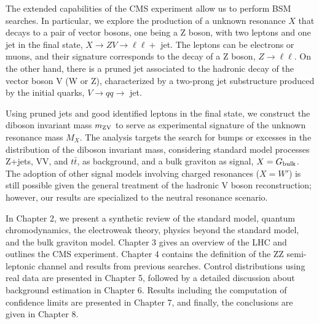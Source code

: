 The extended capabilities of the CMS experiment allow us to perform BSM searches. In particular, we explore the production of a unknown resonance $X$ that decays to a pair of vector bosons, one being a Z boson, with two leptons and one jet in the final state, $X \rightarrow ZV \rightarrow \ell \ell + $ jet. The leptons can be electrons or muons, and their signature corresponds to the decay of a Z boson, $Z\rightarrow \ell \ell$. On the other hand, there is a pruned jet associated to the hadronic decay of the vector boson V (W or Z), characterized by a two-prong jet substructure produced by the initial quarks, $V \rightarrow qq \rightarrow$ jet.

Using pruned jets and good identified leptons in the final state, we construct the diboson invariant mass $m_\mathrm{ZV}$ to serve as experimental signature of the unknown resonance mass $M_X$. The analysis targets the search for bumps or excesses in the distribution of the diboson invariant mass, considering standard model processes Z+jets, VV, and $t\bar{t}$, as background, and a bulk graviton as signal, $X = G_{\rm bulk}$. The adoption of other signal models involving charged resonances ($X=W'$) is still possible given the general treatment of the hadronic V boson reconstruction; however, our results are specialized to the neutral resonance scenario.

In Chapter 2, we present a synthetic review of the standard model, quantum chromodynamics, the electroweak theory, physics beyond the standard model, and the bulk graviton model. Chapter 3 gives an overview of the LHC and outlines the CMS experiment. Chapter 4 contains the definition of the ZZ semi-leptonic channel and results from previous searches. Control distributions using real data are presented in Chapter 5, followed by a detailed discussion about background estimation in Chapter 6. Results including the computation of confidence limits are presented in Chapter 7, and finally, the conclusions are given in Chapter 8.  

